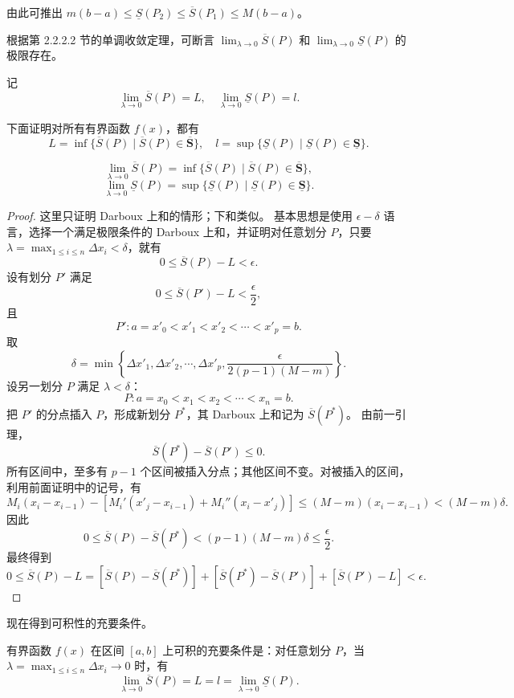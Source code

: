 由此可推出 $m(b-a)\le \underline{S}(P_2)\le \overline{S}(P_1)\le M(b-a)$。

根据第 2.2.2.2 节的单调收敛定理，可断言 $\lim_{\lambda\to 0}\overline{S}(P)$ 和 $\lim_{\lambda\to 0}\underline{S}(P)$ 的极限存在。

记
\[
\lim_{\lambda\to 0}\overline{S}(P)=L,
\quad
\lim_{\lambda\to 0}\underline{S}(P)=l.
\]

下面证明对所有有界函数 $f(x)$，都有
\[
L=\inf\{\overline{S}(P)\mid \overline{S}(P)\in \overline{\mathbf{S}}\},
\quad
l=\sup\{\underline{S}(P)\mid \underline{S}(P)\in \underline{\mathbf{S}}\}.
\]

\begin{lemma}[Darboux 定理]
\[
\lim_{\lambda\to 0}\overline{S}(P)=\inf\{\overline{S}(P)\mid \overline{S}(P)\in\overline{\mathbf{S}}\},
\]
\[
\lim_{\lambda\to 0}\underline{S}(P)=\sup\{\underline{S}(P)\mid \underline{S}(P)\in\underline{\mathbf{S}}\}.
\]
\end{lemma}

\begin{proof}
这里只证明 Darboux 上和的情形；下和类似。
基本思想是使用 $\epsilon-\delta$ 语言，选择一个满足极限条件的 Darboux 上和，并证明对任意划分 $P$，只要 $\lambda=\max_{1\le i\le n}\Delta x_i<\delta$，就有
\[
0\le \overline{S}(P)-L<\epsilon.
\]
设有划分 $P'$ 满足
\[
0\le \overline{S}(P')-L<\frac{\epsilon}{2},
\]
且
\[
P':a=x'_0<x'_1<x'_2<\cdots<x'_p=b.
\]
取
\[
\delta=\min\left\{\Delta x'_1,\Delta x'_2,\cdots,\Delta x'_p,\frac{\epsilon}{2(p-1)(M-m)}\right\}.
\]
设另一划分 $P$ 满足 $\lambda<\delta$：
\[
P:a=x_0<x_1<x_2<\cdots<x_n=b.
\]
把 $P'$ 的分点插入 $P$，形成新划分 $P^*$，其 Darboux 上和记为 $\overline{S}(P^*)$。
由前一引理，
\[
\overline{S}(P^*)-\overline{S}(P')\le 0.
\]
所有区间中，至多有 $p-1$ 个区间被插入分点；其他区间不变。对被插入的区间，利用前面证明中的记号，有
\[
M_i(x_i-x_{i-1})-[M_i'(x'_j-x_{i-1})+M_i''(x_i-x'_j)]\le (M-m)(x_i-x_{i-1})<(M-m)\delta.
\]
因此
\[
0\le \overline{S}(P)-\overline{S}(P^*)<(p-1)(M-m)\delta\le \frac{\epsilon}{2}.
\]
最终得到
\[
0\le \overline{S}(P)-L=[\overline{S}(P)-\overline{S}(P^*)]+[\overline{S}(P^*)-\overline{S}(P')]+[\overline{S}(P')-L]<\epsilon.
\]
\end{proof}

现在得到可积性的充要条件。

\begin{theorem}
有界函数 $f(x)$ 在区间 $[a,b]$ 上可积的充要条件是：对任意划分 $P$，当 $\lambda=\max_{1\le i\le n}\Delta x_i\to 0$ 时，有
\[
\lim_{\lambda\to 0}\overline{S}(P)=L=l=\lim_{\lambda\to 0}\underline{S}(P).
\]
\end{theorem}

